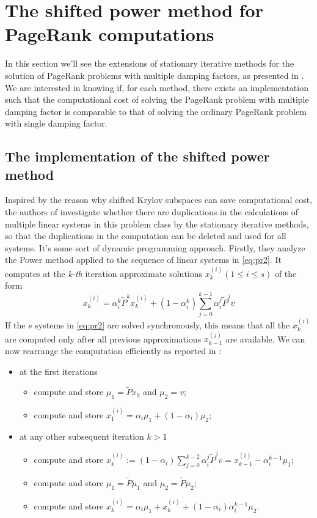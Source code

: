 
\section{The shifted power method for PageRank computations}
In this section we'll see the extensions of stationary iterative methods for the solution of PageRank problems with multiple damping factors, as presented in \cite{SHEN2022126799}. We are interested in knowing if, for each method, there exists an implementation such that the computational cost of solving the PageRank problem with multiple damping factor is comparable to that of solving the ordinary PageRank problem with single damping factor.

\subsection{The implementation of the shifted power method}
Inspired by the reason why shifted Krylov subspaces can save computational cost, the authors of \cite{SHEN2022126799} investigate whether there are duplications in the calculations of multiple linear systems in this problem class by the stationary iterative methods, so that the duplications in the computation can be deleted and used for all systems. It's some sort of dynamic programming approach. Firstly, they analyze the Power method applied to the sequence of linear systems in \ref{eq:pr2}. It computes at the \emph{k-th} iteration approximate solutions $x_k^{(i)} (1 \leq i \leq s)$ of the form
\begin{equation}
    x_k^{(i)} = \alpha_i^k \tilde P^k x_k^{(i)} + (1 - \alpha_i^k) \sum_{j=0}^{k-1} \alpha_i^j \tilde P^j v
\end{equation}
If the $s$ systems in \ref{eq:pr2} are solved synchronously, this means that all the $x^{(i)}_k$ are computed only after all previous approximations $x^{(j)}_{k-1}$ are available. We can now rearrange the computation efficiently as reported in \cite{SHEN2022126799}:
\begin{itemize}
    \item at the first iterations
        \begin{itemize}
            \item compute and store $\mu_1 = \tilde P x_0$ and $\mu_2 = v$;
            \item compute and store $x_1^{(i)} = \alpha_i \mu_1 + (1-\alpha_i)\mu_2;$
        \end{itemize}
    \item at any other subsequent iteration $k>1$
        \begin{itemize}
            \item compute and store $ x_k^{(i)} := (1-\alpha_i)\sum_{j=0}^{k-2} \alpha_i^j \tilde P^j v= x_{k-1}^{(i)} - \alpha_i^{k-1} \mu_1$;
            \item compute and store $\mu_1 = \tilde P \mu_1$ and $\mu_2 = \tilde P \mu_2$;
            \item compute and store $x_k^{(i)} = \alpha_i \mu_1 + x_k^{(i)} + (1-\alpha_i)\alpha^{k-1}_i \mu_2$.
        \end{itemize}
\end{itemize}
